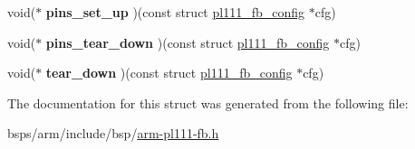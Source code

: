\begin{DoxyCompactItemize}
void($\ast$ {\bfseries pins\+\_\+set\+\_\+up} )(const struct \mbox{\hyperlink{structpl111__fb__config}{pl111\+\_\+fb\+\_\+config}} $\ast$cfg)
\item 
\mbox{\label{structpl111__fb__config_ad1eda265a811d37608a2273d2cd8d352}} 
void($\ast$ {\bfseries pins\+\_\+tear\+\_\+down} )(const struct \mbox{\hyperlink{structpl111__fb__config}{pl111\+\_\+fb\+\_\+config}} $\ast$cfg)
\item 
\mbox{\label{structpl111__fb__config_a502e15bf282d1afe72af9430caebd878}} 
void($\ast$ {\bfseries tear\+\_\+down} )(const struct \mbox{\hyperlink{structpl111__fb__config}{pl111\+\_\+fb\+\_\+config}} $\ast$cfg)
\end{DoxyCompactItemize}


The documentation for this struct was generated from the following file\+:\begin{DoxyCompactItemize}
\item 
bsps/arm/include/bsp/\mbox{\hyperlink{arm-pl111-fb_8h}{arm-\/pl111-\/fb.\+h}}\end{DoxyCompactItemize}
